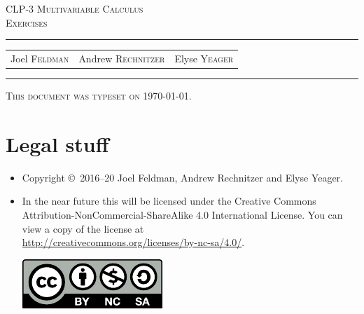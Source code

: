 \documentclass[12pt,letterpaper, openany]{book}
\makeatletter
\newcommand{\reqnomode}{\tagsleft@false}
\makeatother
\begin{document}
\reqnomode

\setcounter{page}{0}

\begin{titlepage} 
\begin{center} 
\textsc{\LARGE
CLP-3 Multivariable Calculus\\[2ex]
Exercises
}\\[2ex]

\vspace{5ex}
\hrule
\vspace{5ex}

\begin{tabular}{ccc}
\large  Joel \textsc{Feldman}  
& \large \qquad Andrew \textsc{Rechnitzer} 
&\large  \qquad Elyse \textsc{Yeager}
\end{tabular}

\end{center}
\vspace{2ex}
\hrule

\vfill
\textsc{This document was typeset on \today.}
\end{titlepage}

\section*{Legal stuff}
\begin{itemize}
 \item Copyright \copyright\ 2016--20 Joel Feldman, Andrew Rechnitzer and Elyse Yeager.

\item In the near future this will be licensed under the 
Creative Commons Attribution-NonCommercial-ShareAlike 4.0 International 
License. You can view a copy of the license at \\
\url{http://creativecommons.org/licenses/by-nc-sa/4.0/}.
\begin{center}
 \includegraphics{fig/by-nc-sa.pdf}
\end{center}
\end{itemize}

\newpage
\end{document}
